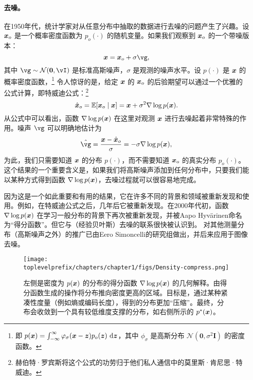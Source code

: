 \documentclass[../../book-main.tex]{subfiles}
\begin{document}
\paragraph{去噪。} 在1950年代，统计学家对从任意分布中抽取的数据进行去噪的问题产生了兴趣。设 $\bm{x}_o$ 是一个概率密度函数为 $p_o(\cdot)$ 的随机变量。如果我们观察到 $\bm{x}_o$ 的一个带噪版本：
\begin{equation}
    \x = \x_o + \sigma \vg, 
\end{equation}
其中 $\vg \sim \dNorm(\vzero, \vI)$ 是标准高斯噪声，$\sigma$ 是观测的噪声水平。设 $p(\cdot)$ 是 $\bm{x}$ 的概率密度函数，\footnote{即 $p(\bm{x}) = \int_{-\infty}^{\infty} \varphi_{\sigma}(\bm{x} - \bm{z})p_o(\bm{z}) ~\mathrm{d}\bm{z}$，其中 $\phi_{\sigma}$ 是高斯分布 $\mathcal{N}(\boldsymbol{0}, \sigma^2 \boldsymbol{I})$ 的密度函数。} 令人惊讶的是，给定 $\bm{x}$ 的 $\bm{x}_o$ 的后验期望可以通过一个优雅的公式计算，即特威迪公式\cite{Robbins1956AnEB}：\footnote{赫伯特·罗宾斯将这个公式的功劳归于他们私人通信中的莫里斯·肯尼思·特威迪。}
\begin{equation}
    \hat {\bm{x}}_o = \mathbb{E}[\bm{x}_o\mid \bm{x}] = \bm{x} + \sigma^2 \nabla \log p(\bm{x}).
\end{equation}
从公式中可以看出，函数 $\nabla \log p(\bm{x})$ 在这里对观测 $\bm{x}$ 进行去噪起着非常特殊的作用。噪声 $\vg$ 可以明确地估计为
\begin{equation}
    \hat{\vg} = \frac{\x - \hat \x_o}{\sigma} = -\sigma \nabla \log p(\x),
\end{equation}
为此，我们只需要知道 $\bm{x}$ 的分布 $p(\cdot)$，而不需要知道 $\bm{x}_o$ 的真实分布 $p_o(\cdot)$。这个结果的一个重要含义是，如果我们将高斯噪声添加到任何分布中，只要我们能以某种方式得到函数 $\nabla \log p(\bm{x})$，去噪过程就可以很容易地完成。

因为这是一个如此重要和有用的结果，它在许多不同的背景和领域被重新发现和使用。例如，在特威迪公式\cite{Robbins1956AnEB}之后，几年后它被\cite{Miyasawa61}重新发现。在2000年代初，函数 $\nabla \log p(\bm{x})$ 在学习一般分布的背景下再次被重新发现，并被Aapo Hyv\"{a}rinen命名为“得分函数”\cite{hyvarinen05a}。但它与（经验贝叶斯）去噪的联系很快被\cite{Vincent2011}认识到。
对其他测量分布（高斯噪声之外）的推广已由Eero Simoncelli的研究组\cite{Raphan10}做出，并后来应用于图像去噪\cite{Kadkhodaie21a,ho2020denoising}。

\begin{figure}
    \centering
    \texttt{[image: \\toplevelprefix/chapters/chapter1/figs/Density-compress.png]}
    \caption{左侧是密度为 $p(\bm{x})$ 的分布的得分函数 $\nabla \log p(\bm{x})$ 的几何解释。由得分函数生成的操作将分布推向密度更高的区域。目标是，通过某种紧凑性度量（例如熵或编码长度），得到的分布更加“压缩”。最终，分布会收敛到一个具有较低维度支撑的分布，如右侧所示的 $p^*(\bm{x})$。}
    \label{fig:score-function}
\end{figure}
\end{document}
